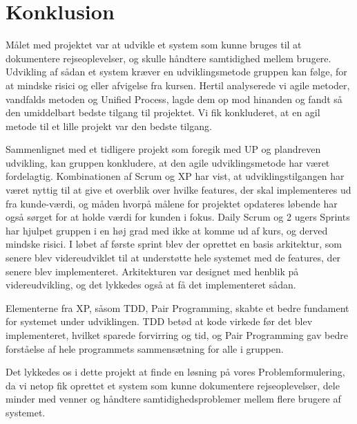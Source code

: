 \chapter{Konklusion}\label{ch:Konklusion}
Målet med projektet var at udvikle et system som kunne bruges til at dokumentere rejseoplevelser, og skulle håndtere samtidighed mellem brugere. Udvikling af sådan et system kræver en udviklingsmetode gruppen kan følge, for at mindske risici og eller afvigelse fra kursen. Hertil analyserede vi agile metoder, vandfalds metoden og Unified Process, lagde dem op mod hinanden og fandt så den umiddelbart bedste tilgang til projektet. Vi fik konkluderet, at en agil metode til et lille projekt var den bedste tilgang. 

Sammenlignet med et tidligere projekt som foregik med UP og plandreven udvikling, kan gruppen konkludere, at den agile udviklingsmetode har været fordelagtig. Kombinationen af Scrum og XP har vist, at udviklingstilgangen har været nyttig til at give et overblik over hvilke features, der skal implementeres ud fra kunde-værdi, og måden hvorpå målene for projektet opdateres løbende har også sørget for at holde værdi for kunden i fokus. Daily Scrum og 2 ugers Sprints har hjulpet gruppen i en høj grad med ikke at komme ud af kurs, og derved mindske risici. 
I løbet af første sprint blev der oprettet en basis arkitektur, som senere blev videreudviklet til at understøtte hele systemet med de features, der senere blev implementeret. Arkitekturen var designet med henblik på videreudvikling, og det lykkedes også at få det implementeret sådan.

Elementerne fra XP, såsom TDD, Pair Programming, skabte et bedre fundament for systemet under udviklingen. TDD betød at kode virkede før det blev implementeret, hvilket sparede forvirring og tid, og Pair Programming gav bedre forståelse af hele programmets sammensætning for alle i gruppen.

Det lykkedes os i dette projekt at finde en løsning på vores Problemformulering, da vi netop fik oprettet et system som kunne dokumentere rejseoplevelser, dele minder med venner og håndtere samtidighedsproblemer mellem flere brugere af systemet.
